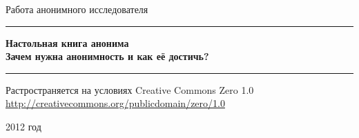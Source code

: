 \begin{titlepage}

\begin{center}
Работа анонимного исследователя
\vspace{10em}

\rule{\linewidth}{0.5mm}
\LARGE \textbf{Настольная книга анонима}\\
\Large \textbf{Зачем нужна анонимность и как её достичь?}
\rule{\linewidth}{0.5mm}
\vfill
\normalsize Растространяется на условиях Creative Commons Zero 1.0\\
\url{http://creativecommons.org/publicdomain/zero/1.0}\\
\begin{figure}[h]
\end{figure}
2012 год
\end{center}

\end{titlepage}
